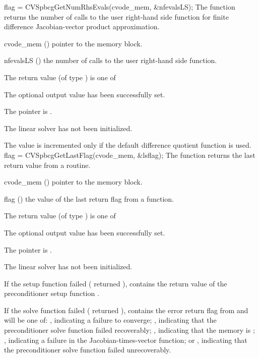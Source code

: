 {}
{
  flag = CVSpbcgGetNumRhsEvals(cvode\_mem, \&nfevalsLS);
}
{
  The function  returns the
  number of calls to the user right-hand side function for
  finite difference Jacobian-vector product approximation.
}
{
  \begin{args}
  \item[cvode\_mem] ()
    pointer to the {\cvode} memory block.
  \item[nfevalsLS] ()
    the number of calls to the user right-hand side function.
  \end{args}
}
{
  The return value  (of type ) is one of
  \begin{args}
  \item[\Id{CVSPBCG\_SUCCESS}] 
    The optional output value has been successfully set.
  \item[\Id{CVSPBCG\_MEM\_NULL}]
    The  pointer is .
  \item[\Id{CVSPBCG\_LMEM\_NULL}]
    The {\cvspbcg} linear solver has not been initialized.
  \end{args}
}
{
  The value  is incremented only if the default 
   difference quotient function is used.
}
{
  flag = CVSpbcgGetLastFlag(cvode\_mem, \&lsflag);
}
{
  The function  returns the
  last return value from a {\cvspbcg} routine. 
}
{
  \begin{args}
  \item[cvode\_mem] ()
    pointer to the {\cvode} memory block.
  \item[flag] ()
    the value of the last return flag from a {\cvspbcg} function.
  \end{args}
}
{
  The return value  (of type ) is one of
  \begin{args}
  \item[\Id{CVSPBCG\_SUCCESS}] 
    The optional output value has been successfully set.
  \item[\Id{CVSPBCG\_MEM\_NULL}]
    The  pointer is .
  \item[\Id{CVSPBCG\_LMEM\_NULL}]
    The {\cvspbcg} linear solver has not been initialized.
  \end{args}
}
{
  If the {\cvspbcg} setup function failed ( returned
  ),  contains the return value of the
  preconditioner setup function .

  If the {\cvspbcg} solve function failed ( returned
  ),  contains the error return flag from
   and will be one of:
 , indicating a failure to converge;
 , indicating that the preconditioner solve function
  failed recoverably;
  , indicating that the {\spbcg} memory is ;
  , indicating a failure in the Jacobian-times-vector
  function; or
  , indicating that the preconditioner solve
  function  failed unrecoverably.
}
